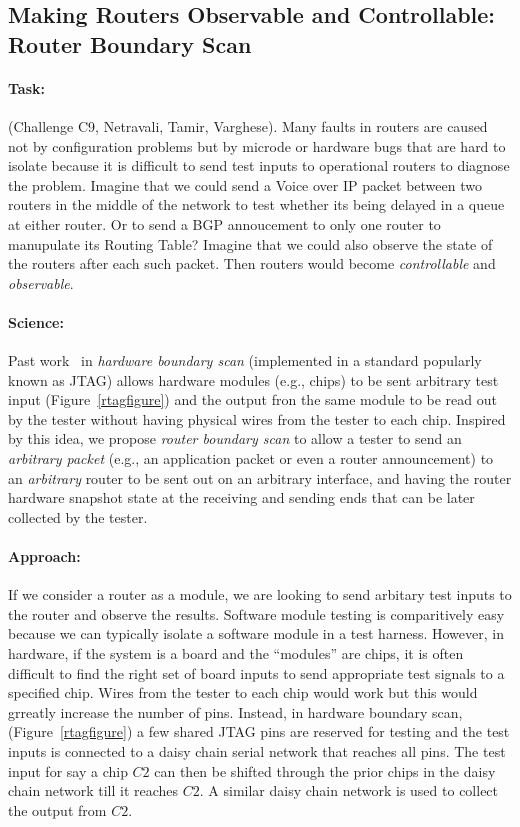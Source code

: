 \subsection{Making Routers Observable and Controllable:  Router Boundary Scan}

\paragraph*{Task:} (Challenge C9, Netravali, Tamir, Varghese).  Many faults in routers are caused not by configuration 
problems but by microde or hardware bugs that are hard to isolate because it is difficult to send test inputs to 
operational routers to diagnose the problem. Imagine that we could send a  Voice over IP packet between two routers in the middle
of the network to test whether its being delayed in a queue at either router.  Or to send a BGP annoucement to only one router to
manupulate its Routing Table?  Imagine that we could also observe the state of the routers after each such packet.  Then routers
would become {\em controllable} and {\em observable}.

\paragraph*{Science:} Past work~\cite{jtag} in {\em hardware boundary scan} (implemented in a standard popularly known as JTAG) allows hardware modules (e.g., chips) to be sent arbitrary test input (Figure~\ref{rtagfigure}) and the output 
fron the same module to be read out by the tester without having physical wires from the tester to each chip.  Inspired
by this idea, we propose {\em router boundary scan} to allow a tester to send an {\em arbitrary packet} (e.g., an application
packet or even a router announcement) to an {\em arbitrary} router to be sent out on an arbitrary interface, and having the 
router hardware snapshot state at the receiving and sending ends that can be later collected by the tester.

\paragraph*{Approach:} If we consider a router as a module, we are looking to send arbitary test inputs to the router and
observe the results.  Software module testing is comparitively easy because we can typically isolate a software module in
a test harness.  However, in hardware, if the system is a board and the ``modules'' are chips, it is often difficult to find 
the right set of board inputs to send appropriate test signals to a specified chip.  Wires from the tester to each chip would
work but this would grreatly increase the number of pins.  Instead, in hardware boundary scan, (Figure~\ref{rtagfigure}) a few
 shared JTAG pins are reserved for testing and the test inputs is connected to a daisy chain serial network that reaches all
 pins.  The test input for say a chip $C2$ can then be shifted through the prior chips in the daisy chain network till it
 reaches $C2$.  A similar daisy chain network is used to collect the output from $C2$.
 
